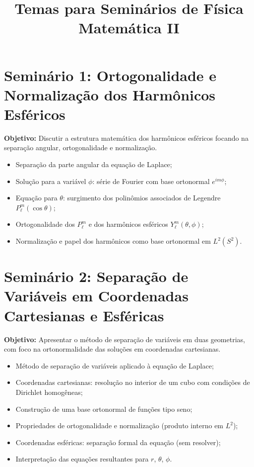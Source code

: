\newif\ifuseseminar
\useseminartrue


\title{Temas para Seminários de Física Matemática II}



\section*{Seminário 1: Ortogonalidade e Normalização dos Harmônicos Esféricos}

\textbf{Objetivo:} Discutir a estrutura matemática dos harmônicos esféricos focando na separação angular, ortogonalidade e normalização.

\begin{itemize}
	\item Separação da parte angular da equação de Laplace;
	\item Solução para a variável \( \phi \): série de Fourier com base ortonormal \( e^{im\phi} \);
	\item Equação para \( \theta \): surgimento dos polinômios associados de Legendre \( P_\ell^m(\cos\theta) \);
	\item Ortogonalidade dos \( P_\ell^m \) e dos harmônicos esféricos \( Y_\ell^m(\theta,\phi) \);
	\item Normalização e papel dos harmônicos como base ortonormal em \( L^2(S^2) \).
\end{itemize}

\vspace{1cm}

\section*{Seminário 2: Separação de Variáveis em Coordenadas Cartesianas e Esféricas}

\textbf{Objetivo:} Apresentar o método de separação de variáveis em duas geometrias, com foco na ortonormalidade das soluções em coordenadas cartesianas.

\begin{itemize}
	\item Método de separação de variáveis aplicado à equação de Laplace;
	\item Coordenadas cartesianas: resolução no interior de um cubo com condições de Dirichlet homogêneas;
	\item Construção de uma base ortonormal de funções tipo seno;
	\item Propriedades de ortogonalidade e normalização (produto interno em \( L^2 \));
	\item Coordenadas esféricas: separação formal da equação (sem resolver);
	\item Interpretação das equações resultantes para \( r \), \( \theta \), \( \phi \).
\end{itemize}

